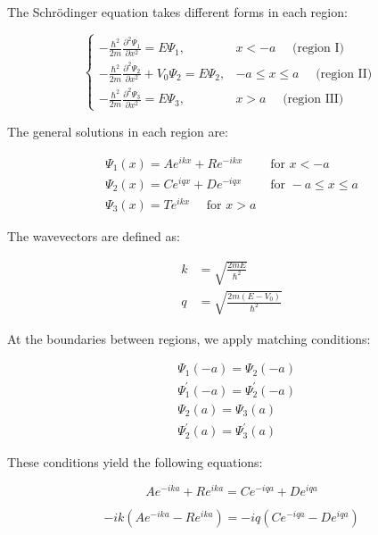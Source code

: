 The Schrödinger equation takes different forms in each region:

\[
\begin{cases}-\frac{\hbar^{2}}{2 m} \frac{\partial^{2} \Psi_{1}}{\partial x^{2}}=E \Psi_{1}, & x<-a \quad \text { (region I) }  \\ -\frac{\hbar^{2}}{2 m} \frac{\partial^{2} \Psi_{2}}{\partial x^{2}}+V_{0} \Psi_{2}=E \Psi_{2}, & -a \leq x \leq a \quad \text { (region II) } \\ -\frac{\hbar^{2}}{2 m} \frac{\partial^{2} \Psi_{3}}{\partial x^{2}}=E \Psi_{3}, & x>a \quad \text { (region III) }\end{cases}
\]

The general solutions in each region are:

\[
\begin{array}{ll}
\Psi_{1}(x)=A e^{i k x}+R e^{-i k x} & \text { for } x<-a \\
\Psi_{2}(x)=C e^{i q x}+D e^{-i q x} & \text { for }-a \leq x \leq a  \\
\Psi_{3}(x)=T e^{i k x} \quad \text { for } x>a &
\end{array}
\]

The wavevectors are defined as:

\begin{align}
k & =\sqrt{\frac{2 m E}{\hbar^{2}}} \\
q & =\sqrt{\frac{2 m\left(E-V_{0}\right)}{\hbar^{2}}}
\end{align}

At the boundaries between regions, we apply matching conditions:

\begin{align}
& \Psi_{1}(-a)=\Psi_{2}(-a) \\
& \Psi_{1}^{\prime}(-a)=\Psi_{2}^{\prime}(-a) \\
& \Psi_{2}(a)=\Psi_{3}(a)  \\
& \Psi_{2}^{\prime}(a)=\Psi_{3}^{\prime}(a)
\end{align}

These conditions yield the following equations:

\begin{equation}
A e^{-i k a}+R e^{i k a}=C e^{-i q a}+D e^{i q a}
\end{equation}

\begin{equation}
-i k\left(A e^{-i k a}-R e^{i k a}\right)=-i q\left(C e^{-i q a}-D e^{i q a}\right)
\end{equation}

